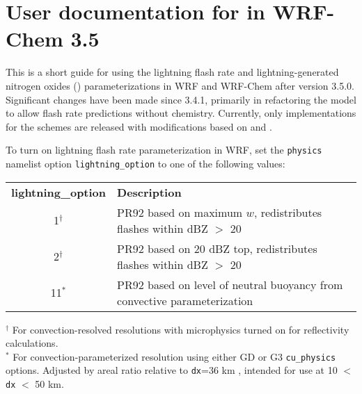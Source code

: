 \chapter{User documentation for  in WRF-Chem 3.5} \label{apdx:lnox-doc}

\ifpdf
    \graphicspath{{Appendix/figures/PNG/}{Appendix/figures/PDF/}{Appendix/figures/}}
\else
    \graphicspath{{Appendix/figures/EPS/}{Appendix/figures/}}
\fi

This is a short guide for using the lightning flash rate and lightning-generated nitrogen oxides () parameterizations in WRF and WRF-Chem after version 3.5.0. Significant changes have been made since 3.4.1, primarily in refactoring the model to allow flash rate predictions without chemistry. Currently, only implementations for the  \citet[][hereafter PR92]{Price:1992wb} schemes are released with modifications based on \citet{Barth:2012qf} and \citet{Wong:2013vn}.

To turn on lightning flash rate parameterization in WRF, set the {\tt physics} namelist option {\tt lightning\_option} to one of the following values:
\begin{center}
\begin{tabular}{cp{4.5in}}
	{\bf lightning\_option} & {\bf Description} \\
	1$^\dagger$ & PR92 based on maximum $w$, redistributes flashes within dBZ $>$ 20 \\
	2$^\dagger$ & PR92 based on 20 dBZ top, redistributes flashes within dBZ $>$ 20  \\
	11$^*$ & PR92 based on level of neutral buoyancy from convective parameterization
\end{tabular} 
\end{center}
{\footnotesize
	$^\dagger$ For convection-resolved resolutions with microphysics turned on for reflectivity calculations. \\
	$^*$ For convection-parameterized resolution using either GD or G3 {\tt cu\_physics} options. Adjusted by areal ratio relative to {\tt dx}=36 km \citep{Wong:2013vn}, intended for use at 10 $<$ {\tt dx} $<$ 50 km.
}
\vspace{.4in}


